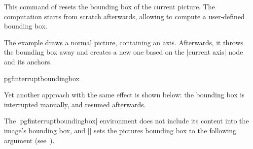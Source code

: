 \begin{command}{\pgfresetboundingbox}
    This command of \pgfname{} resets the bounding box of the current picture.
    The computation starts from scratch afterwards, allowing to compute a
    user-defined bounding box.
\begin{codeexample}[]
\setlength{\fboxsep}{0pt}%
\end{codeexample}
    The example draws a normal picture, containing an axis. Afterwards, it
    throws the bounding box away and creates a new one based on the
    |current axis| node and its anchors.
\end{command}

\begin{environment}{{pgfinterruptboundingbox}}
\label{sec:bounding:box:example}

{
    Yet another approach with the same effect is shown below: the bounding box
    is interrupted manually, and resumed afterwards.
\begin{codeexample}[]
\setlength{\fboxsep}{0pt}%
\end{codeexample}
}
    The |pgfinterruptboundingbox| environment does not include its content into
    the image's bounding box, and |\useasboundingbox| sets the pictures
    bounding box to the following argument (see~\cite{tikz}).
\end{environment}

